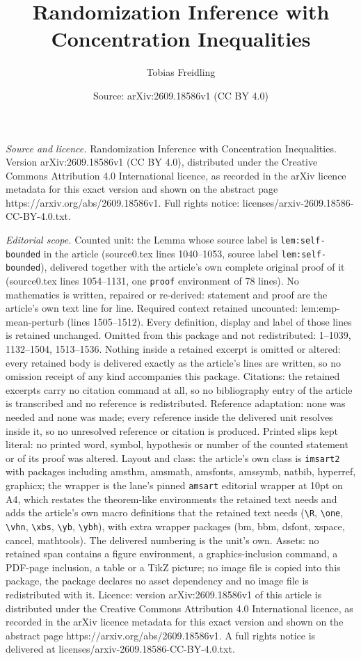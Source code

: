 \documentclass[10pt,a4paper]{amsart}
\title[Randomization Inference with Concentration Inequalities]{Randomization Inference with Concentration Inequalities}
\author{Tobias Freidling}
\date{Source: arXiv:2609.18586v1 (CC BY 4.0)}
\begin{document}
\maketitle

\noindent\emph{Source and licence.} Randomization Inference with Concentration Inequalities. Version arXiv:2609.18586v1 (CC BY 4.0), distributed under the Creative Commons Attribution 4.0 International licence, as recorded in the arXiv licence metadata for this exact version and shown on the abstract page https://arxiv.org/abs/2609.18586v1. Full rights notice: licenses/arxiv-2609.18586-CC-BY-4.0.txt.\par\smallskip

\noindent\textit{Editorial scope.} Counted unit: the Lemma whose source label is \texttt{lem:self-bounded} in the article (source0.tex lines 1040--1053, source label \texttt{lem:self-bounded}), delivered together with the article's own complete original proof of it (source0.tex lines 1054--1131, one \texttt{proof} environment of 78 lines). No mathematics is written, repaired or re-derived: statement and proof are the article's own text line for line. Required context retained uncounted: lem:emp-mean-perturb (lines 1505--1512). Every definition, display and label of those lines is retained unchanged. Omitted from this package and not redistributed: 1--1039, 1132--1504, 1513--1536. Nothing inside a retained excerpt is omitted or altered: every retained body is delivered exactly as the article's lines are written, so no omission receipt of any kind accompanies this package. Citations: the retained excerpts carry no citation command at all, so no bibliography entry of the article is transcribed and no reference is redistributed. Reference adaptation: none was needed and none was made; every reference inside the delivered unit resolves inside it, so no unresolved reference or citation is produced. Printed slips kept literal: no printed word, symbol, hypothesis or number of the counted statement or of its proof was altered. Layout and class: the article's own class is \texttt{imsart2} with packages including amsthm, amsmath, amsfonts, amssymb, natbib, hyperref, graphicx; the wrapper is the lane's pinned \texttt{amsart} editorial wrapper at 10pt on A4, which restates the theorem-like environments the retained text needs and adds the article's own macro definitions that the retained text needs (\texttt{\textbackslash R}, \texttt{\textbackslash one}, \texttt{\textbackslash vhn}, \texttt{\textbackslash xbs}, \texttt{\textbackslash yb}, \texttt{\textbackslash ybh}), with extra wrapper packages (bm, bbm, dsfont, xspace, cancel, mathtools). The delivered numbering is the unit's own. Assets: no retained span contains a figure environment, a graphics-inclusion command, a PDF-page inclusion, a table or a TikZ picture; no image file is copied into this package, the package declares no asset dependency and no image file is redistributed with it. Licence: version arXiv:2609.18586v1 of this article is distributed under the Creative Commons Attribution 4.0 International licence, as recorded in the arXiv licence metadata for this exact version and shown on the abstract page https://arxiv.org/abs/2609.18586v1. A full rights notice is delivered at licenses/arxiv-2609.18586-CC-BY-4.0.txt. 
\end{document}
